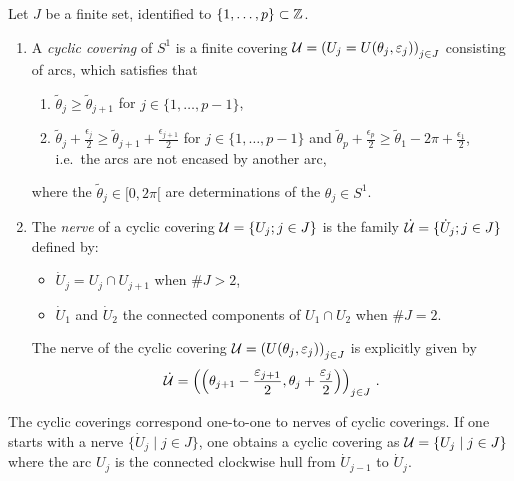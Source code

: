 \begin{defn}
  Let $J$ be a finite set, identified to $\{1,\dots,p\}\subset\mathbb{Z}$.
  \begin{enumerate}
    \item A \emph{cyclic covering} of $S^1$ is a finite covering
      $\mathcal{U}=\left(U_j=U(\theta_j,\varepsilon_j)\right)_{j\in J}$ consisting of
      arcs, which satisfies that
      \begin{enumerate}
        \item $\tilde\theta_j \geq \tilde\theta_{j+1}$ for $j\in\{1,\dots,p-1\}$,
        \item $\tilde\theta_j+\frac{\epsilon_j}{2}\geq
          \tilde\theta_{j+1}+\frac{\epsilon_{j+1}}{2}$ for
          $j\in\{1,\dots,p-1\}$ and
          $\tilde\theta_p+\frac{\epsilon_p}{2}\geq
          \tilde\theta_{1}-2\pi+\frac{\epsilon_{1}}{2}$, i.e.\ the arcs are not
          encased by another arc,
      \end{enumerate}
      where the $\tilde\theta_j\in [0,2\pi[$ are determinations of the
      $\theta_j\in S^1$.
      \begin{comment}
        \begin{enumerate}
          \item the $\theta_j$ are in ascending order with respect to the
            clockwise orientation of $S^1$;
          \item the $U_j\cap U_{j+1}$ have only one connected component when
            $\#J>2$;
          \item the $U_j$ are not encased by another arc, this means that the
            open sets $U_j\backslash U_l$ are connected for all $j,l\in J$.
        \end{enumerate}
      \end{comment}
    \item The \emph{nerve} of a cyclic covering $\mathcal{U}=\{U_j;j\in J\}$ is the
      family $\dot{\mathcal{U}}=\{\dot U_j;j\in J\}$ defined by:
      \begin{itemize}
        \item $\dot U_j=U_j\cap U_{j+1}$ when $\#J>2$,
        \item $\dot U_1$ and $\dot U_2$ the connected components of
          $U_1\cap U_2$ when $\#J=2$.
      \end{itemize}
      \begin{s-rem}
        The nerve of the cyclic covering
        $\mathcal{U}=\left(U(\theta_j,\varepsilon_j)\right)_{j\in J}$ is explicitly given
        by
        \[
          \dot{\mathcal{U}}=\left(
            \left(\theta_{j+1}-\frac{\varepsilon_{j+1}}{2},
            \theta_{j}+\frac{\varepsilon_{j}}{2}\right)
          \right)_{j\in J} \,.
        \]
      \end{s-rem}
  \end{enumerate}
\end{defn}
The cyclic coverings correspond one-to-one to nerves of cyclic coverings. If
one starts with a nerve $\{\dot U_j \mid j\in J\}$, one obtains a cyclic
covering as $\mathcal{U}=\{U_j \mid j\in J\}$ where the arc $U_j$ is the connected
clockwise hull from $\dot U_{j-1}$ to $\dot U_j$.

